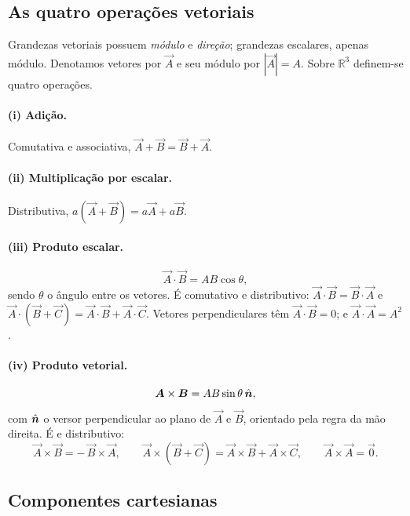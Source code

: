 \subsection{As quatro operações vetoriais}

Grandezas vetoriais possuem \emph{módulo} e \emph{direção}; grandezas escalares,
apenas módulo. Denotamos vetores por $\vec{A}$ e seu módulo por $|\vec{A}|=A$.
Sobre $\mathbb{R}^3$ definem-se quatro operações.

\paragraph{(i) Adição.} Comutativa e associativa,
\(
  \vec{A}+\vec{B}=\vec{B}+\vec{A}.
\)

\paragraph{(ii) Multiplicação por escalar.} Distributiva,
\(
  a(\vec{A}+\vec{B})=a\vec{A}+a\vec{B}.
\)

\paragraph{(iii) Produto escalar.}
\begin{equation}
  \vec{A}\cdot\vec{B}=AB\cos\theta,
\end{equation}
sendo $\theta$ o ângulo entre os vetores. É comutativo e distributivo:
\(
  \vec{A}\cdot\vec{B}=\vec{B}\cdot\vec{A}
\)
e
\(
  \vec{A}\cdot(\vec{B}+\vec{C})=\vec{A}\cdot\vec{B}+\vec{A}\cdot\vec{C}.
\)
Vetores perpendiculares têm $\vec{A}\cdot\vec{B}=0$; e $\vec{A}\cdot\vec{A}=A^2$.

\paragraph{(iv) Produto vetorial.}
\begin{equation}
  \bm{A}\times\bm{B}=AB\sin\theta\,\hat{\bm{n}},
\end{equation}
com $\hat{\bm{n}}$ o versor perpendicular ao plano de $\vec{A}$ e $\vec{B}$, orientado
pela regra da mão direita. É  e distributivo:
\begin{equation}
  \vec{A}\times\vec{B}=-\,\vec{B}\times\vec{A},
  \qquad
  \vec{A}\times(\vec{B}+\vec{C})=\vec{A}\times\vec{B}+\vec{A}\times\vec{C},
  \qquad
  \vec{A}\times\vec{A}=\vec{0}.
\end{equation}

\subsection{Componentes cartesianas}

